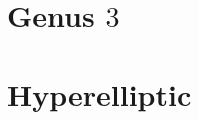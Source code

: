 \documentclass{dcthesis}
\newcommand{\PP}{\mathbb P}
\newtheorem{prop}{Proposition}[section]
\theoremstyle{definition}
\theoremstyle{remark}
\numberwithin{equation}{section}
\numberwithin{figure}{section}
\begin{document}
{  \section{Genus $3$}{\label{sec:genusthree}
  }
  \section{Hyperelliptic}{\label{sec:hyperelliptic}
  }
}
\end{document}
